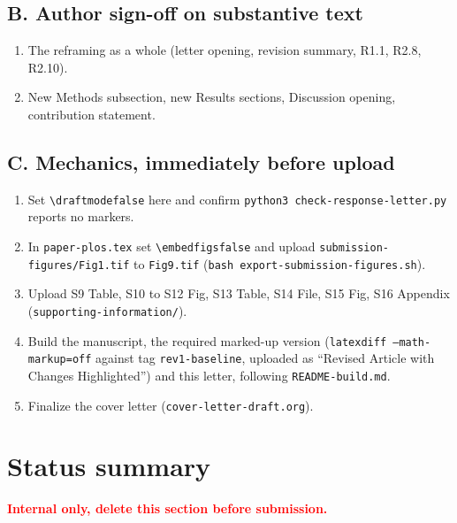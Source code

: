 \documentclass[11pt]{article}
\newif\ifdraftmode\draftmodetrue
\begin{document}
\subsection*{B. Author sign-off on substantive text}

\begin{enumerate}[leftmargin=*, resume]
\item The reframing as a whole (letter opening, revision summary, R1.1, R2.8, R2.10).
\item New Methods subsection, new Results sections, Discussion opening, contribution statement.
\end{enumerate}

\subsection*{C. Mechanics, immediately before upload}

\begin{enumerate}[leftmargin=*, resume]
\item Set \texttt{\textbackslash draftmodefalse} here and confirm
\texttt{python3 check-response-letter.py} reports no markers.
\item In \texttt{paper-plos.tex} set \texttt{\textbackslash embedfigsfalse} and upload
\texttt{submission-figures/Fig1.tif} to \texttt{Fig9.tif} (\texttt{bash export-submission-figures.sh}).
\item Upload S9 Table, S10 to S12 Fig, S13 Table, S14 File, S15 Fig, S16 Appendix
(\texttt{supporting-information/}).
\item Build the manuscript, the required marked-up version (\texttt{latexdiff --math-markup=off}
against tag \texttt{rev1-baseline}, uploaded as ``Revised Article with Changes Highlighted'') and
this letter, following \texttt{README-build.md}.
\item Finalize the cover letter (\texttt{cover-letter-draft.org}).
\end{enumerate}

\fi

\ifdraftmode
\section{Status summary}

\noindent\textcolor{red}{\textbf{Internal only, delete this section before submission.}}
\medskip
\end{document}
